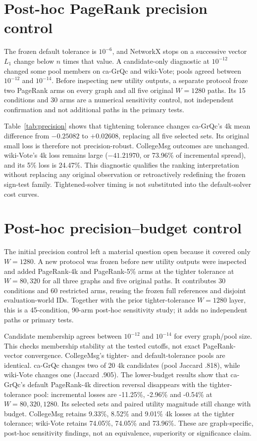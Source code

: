 \documentclass[smallextended]{svjour3}
\begin{document}
\section{Post-hoc PageRank precision control}
The frozen default tolerance is $10^{-6}$, and NetworkX stops on a successive
vector $L_1$ change below $n$ times that value. A candidate-only diagnostic at
$10^{-12}$ changed some pool members on ca-GrQc and wiki-Vote; pools agreed
between $10^{-12}$ and $10^{-14}$. Before inspecting new utility outputs, a
separate protocol froze two PageRank arms on every graph and all five original
$W=1280$ paths. Its 15 conditions and 30 arms are a numerical sensitivity control,
not independent confirmation and not additional paths in the primary tests.

Table~\ref{tab:precision} shows that tightening tolerance changes ca-GrQc's 4k
mean difference from $-0.25082$ to $+0.02608$, replacing all five selected sets.
Its original small loss is therefore not precision-robust. CollegeMsg outcomes
are unchanged. wiki-Vote's 4k loss remains large ($-41.21970$, or 73.96\% of
incremental spread), and its 5\% loss is 24.47\%. This diagnostic qualifies the
ranking interpretation without replacing any original observation or retroactively
redefining the frozen sign-test family. Tightened-solver timing is not substituted
into the default-solver cost curves.

\section{Post-hoc precision--budget control}
The initial precision control left a material question open because it covered
only $W=1280$. A new protocol was frozen before new utility outputs were inspected
and added PageRank-4k and PageRank-5\% arms at the tighter tolerance at $W=80,320$ for all three
graphs and five original paths. It contributes 30 conditions and 60 restricted
arms, reusing the frozen full references and disjoint evaluation-world IDs. Together
with the prior tighter-tolerance $W=1280$ layer, this is a 45-condition, 90-arm post-hoc
sensitivity study; it adds no independent paths or primary tests.

Candidate membership agrees between $10^{-12}$ and $10^{-14}$ for every graph/pool size. This checks membership stability at the tested cutoffs, not exact PageRank-vector convergence.
CollegeMsg's tighter- and default-tolerance pools are identical. ca-GrQc changes two of 20
4k candidates (pool Jaccard .818), while wiki-Vote changes one (Jaccard .905).
The lower-budget results show that ca-GrQc's default PageRank-4k direction reversal
disappears with the tighter-tolerance pool: incremental losses are -11.25\%, -2.96\% and
-0.54\% at $W=80,320,1280$. Its selected sets and paired utility magnitude still
change with budget. CollegeMsg retains 9.33\%, 8.52\% and 9.01\% 4k losses at the tighter tolerance;
wiki-Vote retains 74.05\%, 74.05\% and 73.96\%. These are graph-specific,
post-hoc sensitivity findings, not an equivalence, superiority or significance claim.

\end{document}
